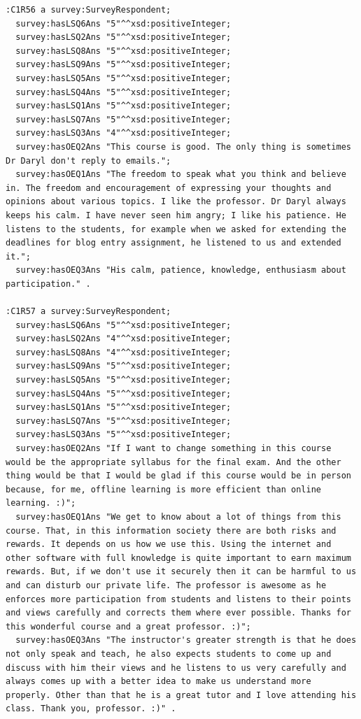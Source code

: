 \begin{lstlisting}
:C1R56 a survey:SurveyRespondent;
  survey:hasLSQ6Ans "5"^^xsd:positiveInteger;
  survey:hasLSQ2Ans "5"^^xsd:positiveInteger;
  survey:hasLSQ8Ans "5"^^xsd:positiveInteger;
  survey:hasLSQ9Ans "5"^^xsd:positiveInteger;
  survey:hasLSQ5Ans "5"^^xsd:positiveInteger;
  survey:hasLSQ4Ans "5"^^xsd:positiveInteger;
  survey:hasLSQ1Ans "5"^^xsd:positiveInteger;
  survey:hasLSQ7Ans "5"^^xsd:positiveInteger;
  survey:hasLSQ3Ans "4"^^xsd:positiveInteger;
  survey:hasOEQ2Ans "This course is good. The only thing is sometimes Dr Daryl don't reply to emails.";
  survey:hasOEQ1Ans "The freedom to speak what you think and believe in. The freedom and encouragement of expressing your thoughts and opinions about various topics. I like the professor. Dr Daryl always keeps his calm. I have never seen him angry; I like his patience. He listens to the students, for example when we asked for extending the deadlines for blog entry assignment, he listened to us and extended it.";
  survey:hasOEQ3Ans "His calm, patience, knowledge, enthusiasm about participation." .

:C1R57 a survey:SurveyRespondent;
  survey:hasLSQ6Ans "5"^^xsd:positiveInteger;
  survey:hasLSQ2Ans "4"^^xsd:positiveInteger;
  survey:hasLSQ8Ans "4"^^xsd:positiveInteger;
  survey:hasLSQ9Ans "5"^^xsd:positiveInteger;
  survey:hasLSQ5Ans "5"^^xsd:positiveInteger;
  survey:hasLSQ4Ans "5"^^xsd:positiveInteger;
  survey:hasLSQ1Ans "5"^^xsd:positiveInteger;
  survey:hasLSQ7Ans "5"^^xsd:positiveInteger;
  survey:hasLSQ3Ans "5"^^xsd:positiveInteger;
  survey:hasOEQ2Ans "If I want to change something in this course would be the appropriate syllabus for the final exam. And the other thing would be that I would be glad if this course would be in person because, for me, offline learning is more efficient than online learning. :)";
  survey:hasOEQ1Ans "We get to know about a lot of things from this course. That, in this information society there are both risks and rewards. It depends on us how we use this. Using the internet and other software with full knowledge is quite important to earn maximum rewards. But, if we don't use it securely then it can be harmful to us and can disturb our private life. The professor is awesome as he enforces more participation from students and listens to their points and views carefully and corrects them where ever possible. Thanks for this wonderful course and a great professor. :)";
  survey:hasOEQ3Ans "The instructor's greater strength is that he does not only speak and teach, he also expects students to come up and discuss with him their views and he listens to us very carefully and always comes up with a better idea to make us understand more properly. Other than that he is a great tutor and I love attending his class. Thank you, professor. :)" .


\end{lstlisting}
